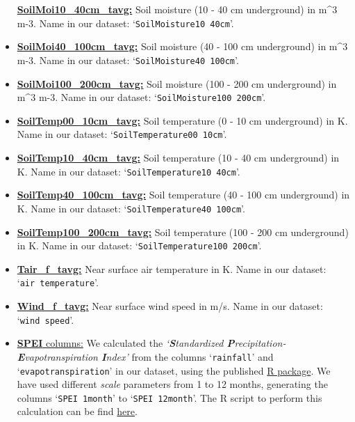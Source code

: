 \documentclass[10pt,parskip=half,
toc=sectionentrywithdots,
bibliography=totocnumbered,
captions=tableheading,numbers=noendperiod]{scrartcl}
\begin{document}
\begin{itemize}
  \href{https://developers.google.com/earth-engine/datasets/catalog/NASA_FLDAS_NOAH01_C_GL_M_V001}{\textbf{SoilMoi10\_40cm\_tavg:}}
  Soil moisture (10 - 40 cm underground) in m\^{}3 m-3. Name in our
  dataset: `\texttt{SoilMoisture10\ 40cm}'.
\item
  \href{https://developers.google.com/earth-engine/datasets/catalog/NASA_FLDAS_NOAH01_C_GL_M_V001}{\textbf{SoilMoi40\_100cm\_tavg:}}
  Soil moisture (40 - 100 cm underground) in m\^{}3 m-3. Name in our
  dataset: `\texttt{SoilMoisture40\ 100cm}'.
\item
  \href{https://developers.google.com/earth-engine/datasets/catalog/NASA_FLDAS_NOAH01_C_GL_M_V001}{\textbf{SoilMoi100\_200cm\_tavg:}}
  Soil moisture (100 - 200 cm underground) in m\^{}3 m-3. Name in our
  dataset: `\texttt{SoilMoisture100\ 200cm}'.
\item
  \href{https://developers.google.com/earth-engine/datasets/catalog/NASA_FLDAS_NOAH01_C_GL_M_V001}{\textbf{SoilTemp00\_10cm\_tavg:}}
  Soil temperature (0 - 10 cm underground) in K. Name in our dataset:
  `\texttt{SoilTemperature00\ 10cm}'.
\item
  \href{https://developers.google.com/earth-engine/datasets/catalog/NASA_FLDAS_NOAH01_C_GL_M_V001}{\textbf{SoilTemp10\_40cm\_tavg:}}
  Soil temperature (10 - 40 cm underground) in K. Name in our dataset:
  `\texttt{SoilTemperature10\ 40cm}'.
\item
  \href{https://developers.google.com/earth-engine/datasets/catalog/NASA_FLDAS_NOAH01_C_GL_M_V001}{\textbf{SoilTemp40\_100cm\_tavg:}}
  Soil temperature (40 - 100 cm underground) in K. Name in our dataset:
  `\texttt{SoilTemperature40\ 100cm}'.
\item
  \href{https://developers.google.com/earth-engine/datasets/catalog/NASA_FLDAS_NOAH01_C_GL_M_V001}{\textbf{SoilTemp100\_200cm\_tavg:}}
  Soil temperature (100 - 200 cm underground) in K. Name in our dataset:
  `\texttt{SoilTemperature100\ 200cm}'.
\item
  \href{https://developers.google.com/earth-engine/datasets/catalog/NASA_FLDAS_NOAH01_C_GL_M_V001}{\textbf{Tair\_f\_tavg:}}
  Near surface air temperature in K. Name in our dataset:
  `\texttt{air\ temperature}'.
\item
  \href{https://developers.google.com/earth-engine/datasets/catalog/NASA_FLDAS_NOAH01_C_GL_M_V001}{\textbf{Wind\_f\_tavg:}}
  Near surface wind speed in m/s. Name in our dataset:
  `\texttt{wind\ speed}'.\\
\item
  \href{https://spei.csic.es/}{\textbf{SPEI} columns:} We calculated the
  \emph{`\textbf{\emph{S}}tandardized
  \textbf{\emph{P}}recipitation-\textbf{\emph{E}}vapotranspiration
  \textbf{\emph{I}}ndex'} from the columns `\texttt{rainfall}' and
  `\texttt{evapotranspiration}' in our dataset, using the published
  \href{https://spei.csic.es/tools.html}{R package}. We have used
  different \emph{scale} parameters from 1 to 12 months, generating the
  columns `\texttt{SPEI\ 1month}' to `\texttt{SPEI\ 12month}'. The R
  script to perform this calculation can be find
  \href{https://github.com/rodekruis/Drought_IBF/blob/master/Model\%20Event\%20Data/SPEI_satellite/calc_SPEI.R}{here}.
\end{itemize}
\end{document}
